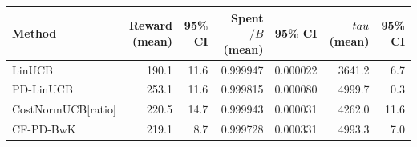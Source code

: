 \begin{tabular}{lrrrrrr}
\toprule
Method & Reward (mean) & 95\% CI & Spent$/B$ (mean) & 95\% CI & $\\tau$ (mean) & 95\% CI \\
\midrule
LinUCB & 190.1 & 11.6 & 0.999947 & 0.000022 & 3641.2 & 6.7 \\
PD-LinUCB & 253.1 & 11.6 & 0.999815 & 0.000080 & 4999.7 & 0.3 \\
CostNormUCB[ratio] & 220.5 & 14.7 & 0.999943 & 0.000031 & 4262.0 & 11.6 \\
CF-PD-BwK & 219.1 & 8.7 & 0.999728 & 0.000331 & 4993.3 & 7.0 \\
\bottomrule
\end{tabular}
